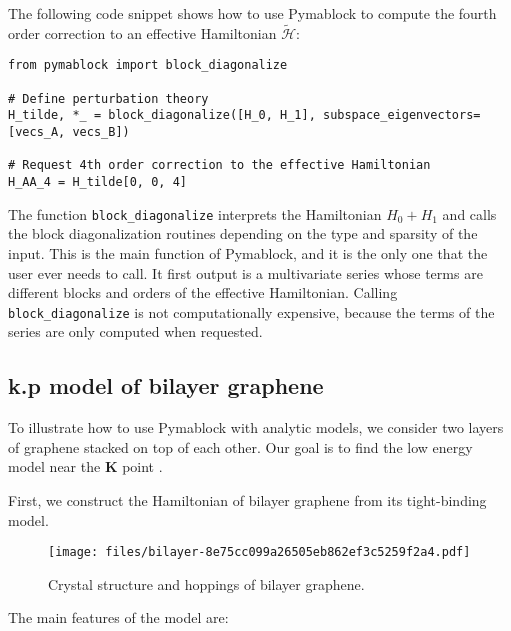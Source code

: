 \documentclass[submission, Codebases]{SciPost}
\begin{document}
{{The following code snippet shows how to use Pymablock to compute the fourth
order correction to an effective Hamiltonian $\tilde{\mathcal{H}}$:

\begin{verbatim}
from pymablock import block_diagonalize

# Define perturbation theory
H_tilde, *_ = block_diagonalize([H_0, H_1], subspace_eigenvectors=[vecs_A, vecs_B])

# Request 4th order correction to the effective Hamiltonian
H_AA_4 = H_tilde[0, 0, 4]
\end{verbatim}


The function \texttt{block\_diagonalize} interprets the Hamiltonian $H_0 +
H_1$ and calls the block diagonalization routines depending on the
type and sparsity of the input.
This is the main function of Pymablock, and it is the only one that the user
ever needs to call.
It first output is a multivariate series whose terms are different blocks and
orders of the effective Hamiltonian.
Calling \texttt{block\_diagonalize} is not computationally expensive, because the
terms of the series are only computed when requested.

\subsection{k.p model of bilayer graphene}


To illustrate how to use Pymablock with analytic models, we consider two layers
of graphene stacked on top of each other.
Our goal is to find the low energy model near the $\mathbf{K}$ point
\cite{McCann_2013}.

First, we construct the Hamiltonian of bilayer graphene from its tight-binding
model.

\begin{figure}[!htbp]
\centering
\texttt{[image: files/bilayer-8e75cc099a26505eb862ef3c5259f2a4.pdf]}
\caption[]{Crystal structure and hoppings of bilayer graphene.}
\label{bilayer}
\end{figure}

The main features of the model are:

}}
\end{document}
